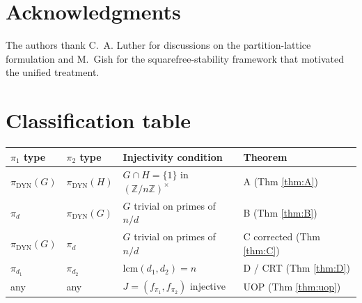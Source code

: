 \documentclass[11pt,reqno]{amsart}
\theoremstyle{plain}
\theoremstyle{definition}
\newcommand{\Z}{\mathbb{Z}}
\newcommand{\Zns}{(\Z/n\Z)^{\times}}
\newcommand{\DYN}{\mathrm{DYN}}
\newcommand{\lcm}{\mathrm{lcm}}
\begin{document}
\section*{Acknowledgments}

The authors thank C.~A. Luther for discussions on the partition-lattice formulation and M.~Gish for the squarefree-stability framework that motivated the unified treatment.

\section*{Classification table}

\begin{center}
\begin{tabular}{|l|l|l|l|}
\hline
$\pi_1$ type & $\pi_2$ type & Injectivity condition & Theorem \\
\hline
$\pi_{\DYN}(G)$ & $\pi_{\DYN}(H)$ & $G \cap H = \{1\}$ in $\Zns$ & A (Thm \ref{thm:A}) \\
$\pi_d$ & $\pi_{\DYN}(G)$ & $G$ trivial on primes of $n/d$ & B (Thm \ref{thm:B}) \\
$\pi_{\DYN}(G)$ & $\pi_d$ & $G$ trivial on primes of $n/d$ & C corrected (Thm \ref{thm:C}) \\
$\pi_{d_1}$ & $\pi_{d_2}$ & $\lcm(d_1,d_2) = n$ & D / CRT (Thm \ref{thm:D}) \\
any & any & $J = (f_{\pi_1},f_{\pi_2})$ injective & UOP (Thm \ref{thm:uop}) \\
\hline
\end{tabular}
\end{center}
\end{document}
